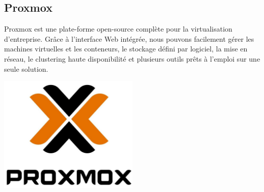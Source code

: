 \documentclass[12pt]{article}
\begin{document}
\subsection{Proxmox}
\noindent%
\begin{minipage}{.7\textwidth}%
Proxmox est une plate-forme open-source complète pour la virtualisation d'entreprise. 
Grâce à l'interface Web intégrée, nous pouvons facilement gérer les machines virtuelles et les conteneurs, le stockage défini par logiciel, la mise en réseau, le clustering haute disponibilité et plusieurs outils prêts à l'emploi sur une seule solution. \\

\end{minipage}%
\hfill
\begin{minipage}{.3\textwidth}%
\begin{center}
\includegraphics[width=0.5\textwidth]{src/logo_proxmox.JPG}
\end{center}
\end{minipage}%
\end{document}
